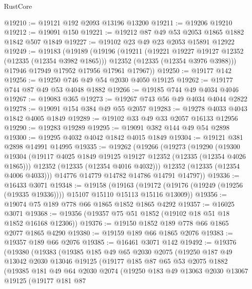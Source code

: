 \begin{lexlean}{RustCore}
\begin{coremodule}
@19210 := @19121 @192 @2093 @13196 @13200
@19211 := @19206 @19210
@19212 := @19091 @150
@19221 := @19212 @87 @49 @53 @2053 @1865 @1882 @1842 @507 @1849
@19227 := @19102 @23 @49 @23 @2053 @15891 @12922
@19249 := @19183
    (@19189
      (@19196
        (@19211
          (@19221 @19227 @19127 @12352 (@12335 (@12354 @3982 @1865)))
          @12352
          (@12335 (@12354 @3976 @3988)))
        @17946
        @17949
        @17952
        @17956
        @17961
        @17967))
@19250 := @19177 @142
@19256 := @19250 @746 @49 @54 @2030 @4050 @19125
@19262 := @19177 @744 @87 @49 @53 @4048 @1882
@19266 := @19185 @744 @49 @4034 @4046
@19267 := @19083 @365
@19273 := @19267 @743 @56 @49 @4034 @4044 @2822
@19278 := @19091 @154 @384 @49 @55 @2057
@19283 := @19278 @4033 @4043 @1842 @4005 @1849
@19289 := @19102 @33 @49 @33 @2057 @16133 @12956
@19290 := @19283 @19289
@19295 := @19091 @382 @144 @49 @54 @2898
@19300 := @19295 @4032 @4042 @1842 @4015 @1849
@19304 := @19121 @381 @2898 @14991 @14995
@19335 := @19262
    (@19266
      (@19273
        (@19290
          (@19300
            @19304
            (@19117 @4025 @1849 @19125 @19127 @12352 (@12335 (@12354 @4026 @1865)))
            @12352
            (@12335 (@12354 @4016 @4032)))
          @12352
          (@12335 (@12354 @4006 @4033)))
        @14776
        @14779
        @14782
        @14786
        @14791
        @14797))
@19336 := @16433 @3071
@19348 := @19158
    (@19163 (@19172 (@19176 (@19249 (@19256 (@19335 @19336)))) @15107 @15110 @15113 @15116 @13009))
@19356 := @19074 @75 @189 @778 @66 @1865 @1852 @1865 @4292
@19357 := @16025 @3071
@19368 := @19356 (@19357 @75 @51 @1852 (@19102 @18 @51 @18 @1852 @16168 @12306))
@19376 := @19150 @1852 @189 @778 @66 @1865 @2077 @1865 @4290
@19380 := @19159 @189 @66 @1865 @2076
@19383 := @19357 @189 @66 @2076
@19385 := @16461 @3071 @142
@19492 := @19376
    (@19380
      (@19383
        (@19385
          @185
          @49
          @65
          @2030
          @2075
          (@19250
            @187
            @49
            @13042
            @2030
            @13046
            @19125
            (@19177
              @185
              @87
              @65
              @53
              @2075
              @1882
              (@19385
                @181
                @49
                @64
                @2030
                @2074
                (@19250
                  @183
                  @49
                  @13063
                  @2030
                  @13067
                  @19125
                  (@19177
                    @181
                    @87

\end{coremodule}
\end{lexlean}
